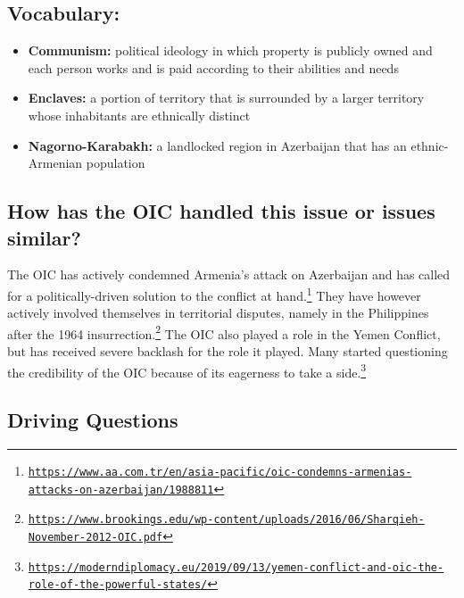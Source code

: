 \documentclass[10pt, letterpaper]{article}
\begin{document}
\subsection{Vocabulary:}

\begin{itemize}
\item
  
  \textbf{Communism:} political ideology in which property is publicly
  owned and each person works and is paid according to their abilities
  and needs
  
\item
  
  \textbf{Enclaves:} a portion of territory that is surrounded by a
  larger territory whose inhabitants are ethnically distinct
  
\item
  
  \textbf{Nagorno-Karabakh:} a landlocked region in Azerbaijan that has
  an ethnic-Armenian population
  
\end{itemize}

\subsection{How has the OIC handled this issue or issues similar?}

The OIC has actively condemned Armenia's attack on Azerbaijan and has
called for a politically-driven solution to the conflict at
hand.\footnote{\texttt{\href{https://www.aa.com.tr/en/asia-pacific/oic-condemns-armenias-attacks-on-azerbaijan/1988811}{{https://www.aa.com.tr/en/asia-pacific/oic-condemns-armenias-attacks-on-azerbaijan/1988811}}}}
They have however actively involved themselves in territorial disputes,
namely in the Philippines after the 1964 insurrection.\footnote{\texttt{\href{https://www.brookings.edu/wp-content/uploads/2016/06/Sharqieh-November-2012-OIC.pdf}{{https://www.brookings.edu/wp-content/uploads/2016/06/Sharqieh-November-2012-OIC.pdf}}}}
The OIC also played a role in the Yemen Conflict, but has received
severe backlash for the role it played. Many started questioning the
credibility of the OIC because of its eagerness to take a
side.\footnote{\texttt{\href{https://moderndiplomacy.eu/2019/09/13/yemen-conflict-and-oic-the-role-of-the-powerful-states/}{{https://moderndiplomacy.eu/2019/09/13/yemen-conflict-and-oic-the-role-of-the-powerful-states/}}}}

\subsection{Driving Questions}
\end{document}
